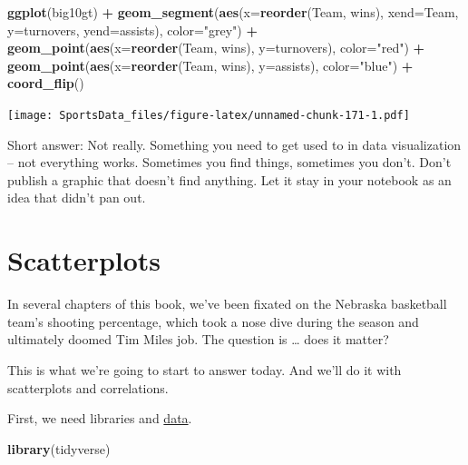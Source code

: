 \documentclass[]{book}
\newenvironment{Shaded}{\begin{snugshade}}{\end{snugshade}}
\newcommand{\DataTypeTok}[1]{\textcolor[rgb]{0.13,0.29,0.53}{#1}}
\newcommand{\KeywordTok}[1]{\textcolor[rgb]{0.13,0.29,0.53}{\textbf{#1}}}
\newcommand{\NormalTok}[1]{#1}
\newcommand{\OperatorTok}[1]{\textcolor[rgb]{0.81,0.36,0.00}{\textbf{#1}}}
\newcommand{\StringTok}[1]{\textcolor[rgb]{0.31,0.60,0.02}{#1}}
\begin{document}
\begin{Shaded}
\begin{Highlighting}[]
\KeywordTok{ggplot}\NormalTok{(big10gt) }\OperatorTok{+}
\StringTok{  }\KeywordTok{geom_segment}\NormalTok{(}\KeywordTok{aes}\NormalTok{(}\DataTypeTok{x=}\KeywordTok{reorder}\NormalTok{(Team, wins), }\DataTypeTok{xend=}\NormalTok{Team, }\DataTypeTok{y=}\NormalTok{turnovers, }\DataTypeTok{yend=}\NormalTok{assists), }\DataTypeTok{color=}\StringTok{"grey"}\NormalTok{) }\OperatorTok{+}\StringTok{ }
\StringTok{  }\KeywordTok{geom_point}\NormalTok{(}\KeywordTok{aes}\NormalTok{(}\DataTypeTok{x=}\KeywordTok{reorder}\NormalTok{(Team, wins), }\DataTypeTok{y=}\NormalTok{turnovers), }\DataTypeTok{color=}\StringTok{"red"}\NormalTok{) }\OperatorTok{+}\StringTok{ }
\StringTok{  }\KeywordTok{geom_point}\NormalTok{(}\KeywordTok{aes}\NormalTok{(}\DataTypeTok{x=}\KeywordTok{reorder}\NormalTok{(Team, wins), }\DataTypeTok{y=}\NormalTok{assists), }\DataTypeTok{color=}\StringTok{"blue"}\NormalTok{) }\OperatorTok{+}
\StringTok{  }\KeywordTok{coord_flip}\NormalTok{()}
\end{Highlighting}
\end{Shaded}

\texttt{[image: SportsData\_files/figure-latex/unnamed-chunk-171-1.pdf]}

Short answer: Not really. Something you need to get used to in data visualization -- not everything works. Sometimes you find things, sometimes you don't. Don't publish a graphic that doesn't find anything. Let it stay in your notebook as an idea that didn't pan out.

\hypertarget{scatterplots}{%
\chapter{Scatterplots}\label{scatterplots}}

In several chapters of this book, we've been fixated on the Nebraska basketball team's shooting percentage, which took a nose dive during the season and ultimately doomed Tim Miles job. The question is \ldots{} does it matter?

This is what we're going to start to answer today. And we'll do it with scatterplots and correlations.

First, we need libraries and \href{https://unl.box.com/s/a8m91bro10t89watsyo13yjegb1fy009}{data}.

\begin{Shaded}
\begin{Highlighting}[]
\KeywordTok{library}\NormalTok{(tidyverse)}
\end{Highlighting}
\end{Shaded}
\end{document}
